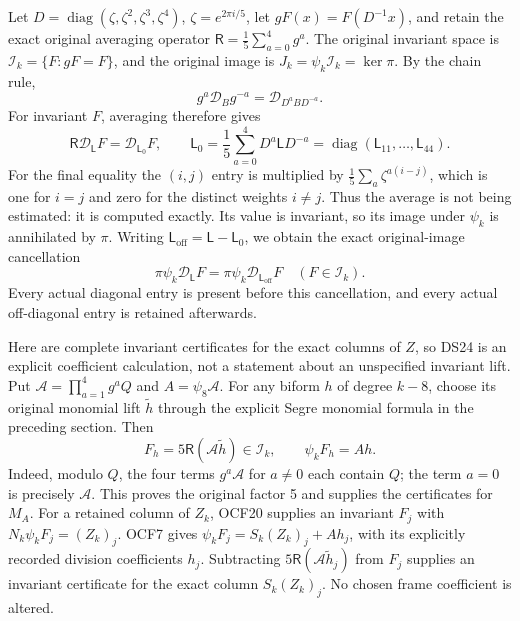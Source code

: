 \documentclass[11pt]{article}
\newcommand{\calD}{\mathscr D}
\begin{document}
Let \(D=\operatorname{diag}(\zeta,\zeta^2,\zeta^3,\zeta^4)\),
\(\zeta=e^{2\pi i/5}\), let \(gF(x)=F(D^{-1}x)\), and retain
the exact original averaging operator
\(\mathsf R=\tfrac15\sum_{a=0}^4g^a\).
The original invariant space is \(\mathscr I_k=\{F:gF=F\}\), and
the original image is \(J_k=\psi_k\mathscr I_k=\ker\pi\).
By the chain rule,
\[
g^a\calD_Bg^{-a}=\calD_{D^aBD^{-a}}.
\]
For invariant \(F\), averaging therefore gives
\begin{equation}\label{eq:reynolds}
\mathsf R\calD_{\mathsf L}F=\calD_{\mathsf L_0}F,
\qquad
\mathsf L_0=\frac15\sum_{a=0}^4D^a\mathsf LD^{-a}
=\operatorname{diag}(\mathsf L_{11},\ldots,\mathsf L_{44}).
\tag{DS23}
\end{equation}
For the final equality the \((i,j)\) entry is multiplied by
\(\tfrac15\sum_a\zeta^{a(i-j)}\), which is one for \(i=j\)
and zero for the distinct weights \(i\ne j\). Thus the average is
not being estimated: it is computed exactly. Its value is invariant,
so its image under \(\psi_k\) is annihilated by \(\pi\).
Writing \(\mathsf L_{\mathrm{off}}=\mathsf L-\mathsf L_0\), we obtain
the exact original-image cancellation
\begin{equation}\label{eq:offdiag-cancellation}
\boxed{\pi\psi_k\calD_{\mathsf L}F
=\pi\psi_k\calD_{\mathsf L_{\mathrm{off}}}F
\quad(F\in\mathscr I_k).}
\tag{DS24}
\end{equation}
Every actual diagonal entry is present before this cancellation, and
every actual off-diagonal entry is retained afterwards.

Here are complete invariant certificates for the exact columns of
\(Z\), so DS24 is an explicit coefficient calculation, not a
statement about an unspecified invariant lift. Put
\(\mathcal A=\prod_{a=1}^4g^aQ\) and
\(A=\psi_8\mathcal A\). For any biform \(h\) of degree \(k-8\),
choose its original monomial lift \(\widetilde h\) through the explicit
Segre monomial formula in the preceding section. Then
\[
F_h=5\mathsf R(\mathcal A\widetilde h)\in\mathscr I_k,
\qquad\psi_kF_h=A h.
\]
Indeed, modulo \(Q\), the four terms \(g^a\mathcal A\) for
\(a\ne0\) each contain \(Q\); the term \(a=0\) is precisely
\(\mathcal A\). This proves the original factor 5 and supplies the
certificates for \(M_A\). For a retained column of \(Z_k\), OCF20
supplies an invariant \(F_j\) with
\(N_k\psi_kF_j=(Z_k)_j\). OCF7 gives
\(\psi_kF_j=S_k(Z_k)_j+A h_j\), with its explicitly recorded
division coefficients \(h_j\). Subtracting
\(5\mathsf R(\mathcal A\widetilde h_j)\) from \(F_j\) supplies
an invariant certificate for the exact column \(S_k(Z_k)_j\).
No chosen frame coefficient is altered.
\end{document}
